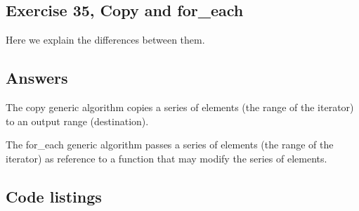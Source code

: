 \documentclass[11pt]{article}
\begin{document}
\subsection*{Exercise 35, Copy and for\_each}
Here we explain the differences between them.

\subsection*{Answers}
The copy generic algorithm copies a series of elements (the range of
the iterator) to an output range (destination).

The for\_each generic algorithm passes a series of elements (the range
of the iterator) as reference to a function that may modify the
series of elements.

\subsection*{Code listings}


\end{document}
